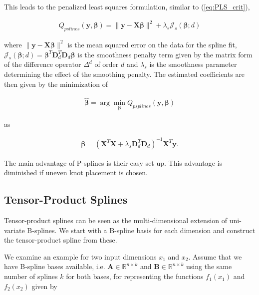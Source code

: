 \documentclass[10pt,a4paper]{article}
\begin{document}
This leads to the penalized least squares formulation, similar to (\ref{eq:PLS_crit}),

\begin{align} \label{eq:OF_psplines}
	Q_{pslines}(\boldsymbol{y}, \boldsymbol{\beta}) = \lVert \boldsymbol{y} - \boldsymbol{X} \boldsymbol{\beta}\rVert^2 + \lambda_s \mathcal J_s(\boldsymbol{\beta};d)
\end{align}

where $\lVert \boldsymbol{y} - \boldsymbol{X} \boldsymbol{\beta} \rVert^2$ is the mean squared error on the data for the spline fit, $\mathcal J_s(\boldsymbol{\beta};d) = \boldsymbol{\beta}^T \boldsymbol{D}_d^T \boldsymbol{D}_d \boldsymbol{\beta}$ is the smoothness penalty term given by the matrix form of the difference operator $\Delta^d$ of order $d$ and $\lambda_s$ is the smoothness parameter determining the effect of the smoothing penalty. The estimated coefficients are then given by the minimization of

\begin{align}
	\boldsymbol{\hat{\beta}} = \arg \min_{\boldsymbol{\beta}} Q_{psplines}(\boldsymbol{y}, \boldsymbol{\beta})
\end{align}

as

\begin{align}
	\boldsymbol{\beta} = (\boldsymbol{X}^T \boldsymbol{X} + \lambda_s \boldsymbol{D}_d^T \boldsymbol{D}_d)^{-1} \boldsymbol{X}^T \boldsymbol{y}.
\end{align}

The main advantage of P-splines is their easy set up. This advantage is diminished if uneven knot placement is chosen. 

\subsection{Tensor-Product Splines}

Tensor-product splines can be seen as the multi-dimensional extension of uni-variate B-splines. We start with a B-spline basis for each dimension and construct the tensor-product spline from these. 

We examine an example for two input dimensions $x_1$ and $x_2$. Assume that we have B-spline bases available, i.e. $\boldsymbol{A} \in \mathbb{R}^{n \times k}$ and $\boldsymbol{B} \in \mathbb{R}^{n \times k}$ using the same number of splines $k$ for both bases, for representing the functions $f_1(x_1)$ and $f_2(x_2)$ given by
\end{document}
